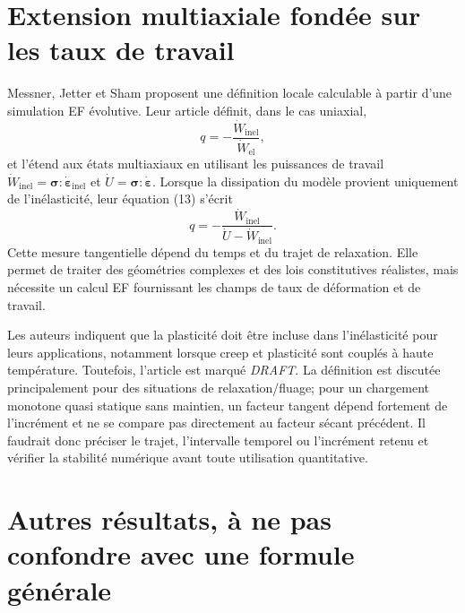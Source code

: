 \documentclass[11pt,a4paper]{article}
\begin{document}
\section{Extension multiaxiale fondée sur les taux de travail}

Messner, Jetter et Sham proposent une définition locale calculable à partir
d'une simulation EF évolutive. Leur article définit, dans le cas uniaxial,
\[
  q=-\frac{\dot W_{\mathrm{inel}}}{\dot W_{\mathrm{el}}},
\]
et l'étend aux états multiaxiaux en utilisant les puissances de travail
\(\dot W_{\mathrm{inel}}=\boldsymbol{\sigma}:\dot{\boldsymbol{\varepsilon}}_{\mathrm{inel}}\)
et
\(\dot U=\boldsymbol{\sigma}:\dot{\boldsymbol{\varepsilon}}\). Lorsque la
dissipation du modèle provient uniquement de l'inélasticité, leur équation
(13) s'écrit
\[
  q=-\frac{\dot W_{\mathrm{inel}}}{\dot U-\dot W_{\mathrm{inel}}}.
\]
Cette mesure tangentielle dépend du temps et du trajet de relaxation. Elle
permet de traiter des géométries complexes et des lois constitutives réalistes,
mais nécessite un calcul EF fournissant les champs de taux de déformation et de
travail.

Les auteurs indiquent que la plasticité doit être incluse dans l'inélasticité
pour leurs applications, notamment lorsque creep et plasticité sont couplés à
haute température. Toutefois, l'article est marqué \emph{DRAFT}. La définition
est discutée principalement pour des situations de relaxation/fluage; pour un
chargement monotone quasi statique sans maintien, un facteur tangent dépend
fortement de l'incrément et ne se compare pas directement au facteur sécant
précédent. Il faudrait donc préciser le trajet, l'intervalle temporel ou
l'incrément retenu et vérifier la stabilité numérique avant toute utilisation
quantitative.

\section{Autres résultats, à ne pas confondre avec une formule générale}
\end{document}
